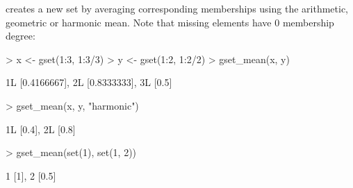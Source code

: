 \documentclass[article]{jss}
\newcommand{\codefun}[1]{\code{#1()}}
\begin{document}
\codefun{gset\_mean} creates a new set by averaging corresponding
memberships using the arithmetic, geometric or harmonic mean.
Note that missing elements have 0 membership degree:
\begin{Schunk}
\begin{Sinput}
> x <- gset(1:3, 1:3/3)
> y <- gset(1:2, 1:2/2)
> gset_mean(x, y)
\end{Sinput}
\begin{Soutput}
{1L [0.4166667], 2L [0.8333333], 3L [0.5]}
\end{Soutput}
\begin{Sinput}
> gset_mean(x, y, "harmonic")
\end{Sinput}
\begin{Soutput}
{1L [0.4], 2L [0.8]}
\end{Soutput}
\begin{Sinput}
> gset_mean(set(1), set(1, 2))
\end{Sinput}
\begin{Soutput}
{1 [1], 2 [0.5]}
\end{Soutput}
\end{Schunk}
\end{document}
